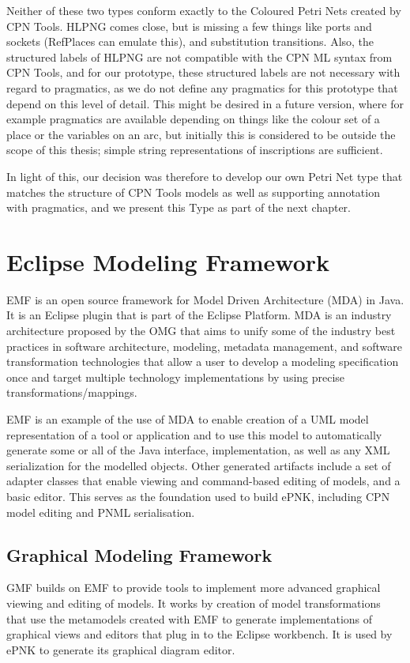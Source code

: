 Neither of these two types conform exactly to the Coloured Petri Nets created by
CPN Tools. HLPNG comes close, but is missing a few things like ports and sockets
(RefPlaces can emulate this), and substitution transitions. Also, the
structured labels of HLPNG are not compatible with the CPN ML syntax from CPN
Tools, and for our prototype, these structured labels are not necessary with regard to
pragmatics, as we do not define any pragmatics for this prototype that depend on
this level of detail. This might be desired in a future version, where for
example  pragmatics are available depending on things like the colour set of a
place or the variables on an arc, but initially this is considered to be outside the
scope of this thesis; simple string representations of inscriptions are
sufficient.

In light of this, our decision was therefore to develop our own Petri Net type
that matches the structure of CPN Tools models as well as supporting annotation
with pragmatics, and we present this Type as part of the next chapter.

\section{Eclipse Modeling Framework}
EMF is an open source framework for Model Driven Architecture (MDA) in Java. It
is an Eclipse plugin that is part of the Eclipse Platform. MDA is an
industry architecture proposed by the OMG that aims to unify some of the
industry best practices in software architecture, modeling, metadata management,
and software transformation technologies that allow a user to develop a
modeling specification once and target multiple technology implementations by
using precise transformations/mappings. 

EMF is an example of the use of MDA to enable creation of a UML model
representation of a tool or application and to use this model to automatically
generate some or all of the Java interface, implementation, as well as any XML
serialization for the modelled objects.
Other generated artifacts include a set of adapter classes that enable
viewing and command-based editing of models, and a basic editor. This serves as
the foundation used to build ePNK, including CPN model editing and PNML
serialisation.

	\subsection{Graphical Modeling Framework}
	GMF builds on EMF to provide tools to implement more advanced graphical viewing
	and editing of models. It works by creation of model transformations that use
	the metamodels created with EMF to generate implementations of graphical views and
	editors that plug in to the Eclipse workbench. It is used by ePNK to generate
	its graphical diagram editor.
	
